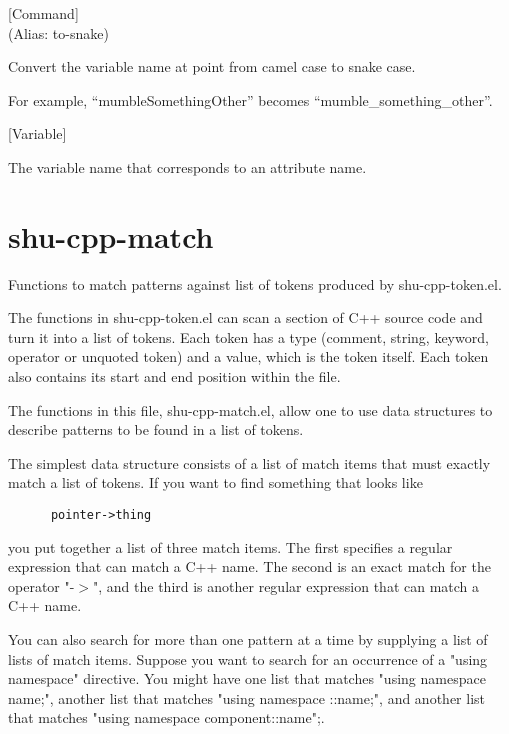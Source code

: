 \vspace{1em}
\noindent
{}
\usebox{\funcname}
 \hfill [Command]\\%
 (Alias: to-snake)

\begin{doc-string}
Convert the variable name at point from camel case to snake case.

For example, ``mumbleSomethingOther'' becomes ``mumble\_something\_other''.
\end{doc-string}

\vspace{1em}
\noindent
{}
\usebox{\funcname}
 \hfill [Variable]

\begin{doc-string}
The variable name that corresponds to an attribute name.
\end{doc-string}

\eject
\section{shu-cpp-match}


Functions to match patterns against list of tokens produced by
shu-cpp-token.el.


The functions in shu-cpp-token.el can scan a section of C++ source code and
turn it into a list of tokens.  Each token has a type (comment, string,
keyword, operator or unquoted token) and a value, which is the token itself.
Each token also contains its start and end position within the file.

The functions in this file, shu-cpp-match.el, allow one to use data
structures to describe patterns to be found in a list of tokens.

The simplest data structure consists of a list of match items that must
exactly match a list of tokens.  If you want to find something that looks
like

\small{\begin{verbatim}
      pointer->thing
\end{verbatim}}

you put together a list of three match items.  The first specifies a regular
expression that can match a C++ name.  The second is an exact match for the
operator "-$>$", and the third is another regular expression that can match a
C++ name.

You can also search for more than one pattern at a time by supplying a list
of lists of match items.  Suppose you want to search for an occurrence of a
"using namespace" directive.  You might have one list that matches "using
namespace name;", another list that matches "using namespace ::name;", and
another list that matches "using namespace component::name";.

